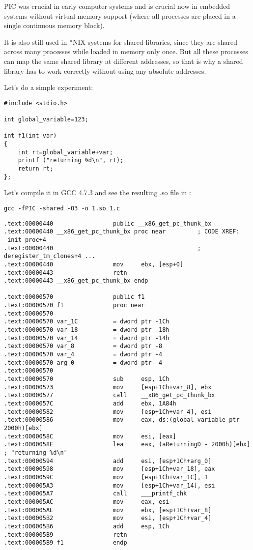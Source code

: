 \ac{PIC} was crucial in early computer systems and is crucial now in embedded systems without 
virtual memory support (where all processes are placed in a single continuous memory block).

It is also still used in *NIX systems for shared libraries, since they 
are shared across many processes while loaded in memory only once.
But all these processes can 
map the same shared library at different addresses, so that is why
a shared library has to work correctly without using any absolute addresses.

Let's do a simple experiment:

\begin{lstlisting}
#include <stdio.h>

int global_variable=123;

int f1(int var)
{
    int rt=global_variable+var;
    printf ("returning %d\n", rt);
    return rt;
};
\end{lstlisting}

Let's compile it in GCC 4.7.3 and see the resulting .so file in \IDA:

\begin{lstlisting}
gcc -fPIC -shared -O3 -o 1.so 1.c
\end{lstlisting}

\begin{lstlisting}[caption=GCC 4.7.3]
.text:00000440                 public __x86_get_pc_thunk_bx
.text:00000440 __x86_get_pc_thunk_bx proc near         ; CODE XREF: _init_proc+4
.text:00000440                                         ; deregister_tm_clones+4 ...
.text:00000440                 mov     ebx, [esp+0]
.text:00000443                 retn
.text:00000443 __x86_get_pc_thunk_bx endp

.text:00000570                 public f1
.text:00000570 f1              proc near
.text:00000570
.text:00000570 var_1C          = dword ptr -1Ch
.text:00000570 var_18          = dword ptr -18h
.text:00000570 var_14          = dword ptr -14h
.text:00000570 var_8           = dword ptr -8
.text:00000570 var_4           = dword ptr -4
.text:00000570 arg_0           = dword ptr  4
.text:00000570
.text:00000570                 sub     esp, 1Ch
.text:00000573                 mov     [esp+1Ch+var_8], ebx
.text:00000577                 call    __x86_get_pc_thunk_bx
.text:0000057C                 add     ebx, 1A84h
.text:00000582                 mov     [esp+1Ch+var_4], esi
.text:00000586                 mov     eax, ds:(global_variable_ptr - 2000h)[ebx]
.text:0000058C                 mov     esi, [eax]
.text:0000058E                 lea     eax, (aReturningD - 2000h)[ebx] ; "returning %d\n"
.text:00000594                 add     esi, [esp+1Ch+arg_0]
.text:00000598                 mov     [esp+1Ch+var_18], eax
.text:0000059C                 mov     [esp+1Ch+var_1C], 1
.text:000005A3                 mov     [esp+1Ch+var_14], esi
.text:000005A7                 call    ___printf_chk
.text:000005AC                 mov     eax, esi
.text:000005AE                 mov     ebx, [esp+1Ch+var_8]
.text:000005B2                 mov     esi, [esp+1Ch+var_4]
.text:000005B6                 add     esp, 1Ch
.text:000005B9                 retn
.text:000005B9 f1              endp
\end{lstlisting}

